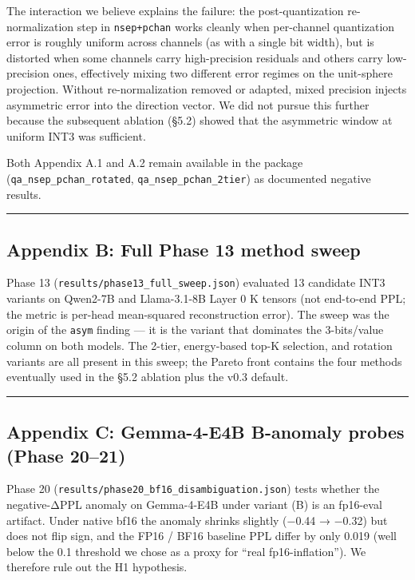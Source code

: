 \documentclass[
]{article}
\begin{document}
The interaction we believe explains the failure: the post-quantization
re-normalization step in \texttt{nsep+pchan} works cleanly when
per-channel quantization error is roughly uniform across channels (as
with a single bit width), but is distorted when some channels carry
high-precision residuals and others carry low-precision ones,
effectively mixing two different error regimes on the unit-sphere
projection. Without re-normalization removed or adapted, mixed precision
injects asymmetric error into the direction vector. We did not pursue
this further because the subsequent ablation (§5.2) showed that the
asymmetric window at uniform INT3 was sufficient.

Both Appendix A.1 and A.2 remain available in the package
(\texttt{qa\_nsep\_pchan\_rotated}, \texttt{qa\_nsep\_pchan\_2tier}) as
documented negative results.

\begin{center}\rule{0.5\linewidth}{0.5pt}\end{center}

\subsection{Appendix B: Full Phase 13 method
sweep}\label{appendix-b-full-phase-13-method-sweep}

Phase 13 (\texttt{results/phase13\_full\_sweep.json}) evaluated 13
candidate INT3 variants on Qwen2-7B and Llama-3.1-8B Layer 0 K tensors
(not end-to-end PPL; the metric is per-head mean-squared reconstruction
error). The sweep was the origin of the \texttt{asym} finding --- it is
the variant that dominates the 3-bits/value column on both models. The
2-tier, energy-based top-K selection, and rotation variants are all
present in this sweep; the Pareto front contains the four methods
eventually used in the §5.2 ablation plus the v0.3 default.

\begin{center}\rule{0.5\linewidth}{0.5pt}\end{center}

\subsection{Appendix C: Gemma-4-E4B B-anomaly probes (Phase
20--21)}\label{appendix-c-gemma-4-e4b-b-anomaly-probes-phase-2021}

Phase 20 (\texttt{results/phase20\_bf16\_disambiguation.json}) tests
whether the negative-ΔPPL anomaly on Gemma-4-E4B under variant (B) is an
fp16-eval artifact. Under native bf16 the anomaly shrinks slightly
(−0.44 → −0.32) but does not flip sign, and the FP16 / BF16 baseline PPL
differ by only 0.019 (well below the 0.1 threshold we chose as a proxy
for ``real fp16-inflation''). We therefore rule out the H1 hypothesis.
\end{document}
